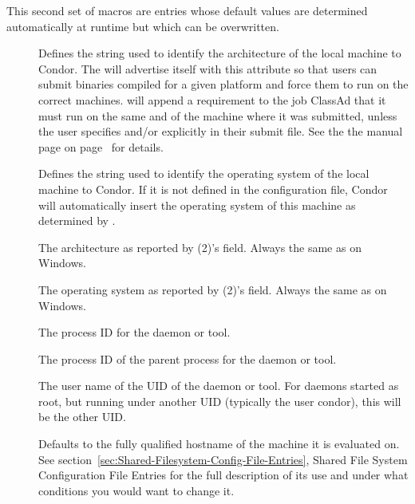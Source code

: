 This second set of macros are entries whose default values are
determined automatically at runtime but which can be overwritten.  
\begin{description}

\item[] \label{param:Arch}
  Defines the string
  used to identify the architecture of the local machine to Condor.
  The  will advertise itself with this attribute so
  that users can submit binaries compiled for a given platform and
  force them to run on the correct machines.   will
  append a requirement to the job ClassAd that it must
  run on the same  and  of the machine where
  it was submitted, unless the user specifies  and/or
   explicitly in their submit file.  See the
  the  manual page
  on page~\pageref{man-condor-submit} for details.

\item[] \label{param:OpSys}
  Defines the string used to identify the operating system
  of the local machine to Condor.
  If it is not defined in the configuration file, Condor will
  automatically insert the operating system of this machine as
  determined by .

\item[] \label{param:UnameArch}
  The architecture as reported by (2)'s  field.
  Always the same as  on Windows.

\item[] \label{param:UnameOpsys}
  The operating system as reported by (2)'s  field.
  Always the same as  on Windows.

\item[] \label{param:Pid}
  The process ID for the daemon or tool.

\item[] \label{param:Ppid}
  The process ID of the parent process for the daemon or tool.

\item[] \label{param:Username}
  The user name of the UID of the daemon or tool.
  For daemons started as root, but running under another UID
  (typically the user condor), this will be the other UID.

\item[]
  \label{param:FilesystemDomain}
  Defaults to the fully
  qualified hostname of the machine it is evaluated on.  See
  section~\ref{sec:Shared-Filesystem-Config-File-Entries}, Shared
  File System Configuration File Entries for the full description of
  its use and under what conditions you would want to change it.


\end{description}
